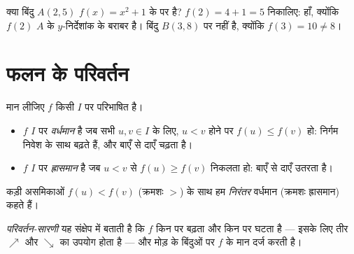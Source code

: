 \begin{example}\label{ex:g10:functions:membership}
क्या बिंदु $A(2, 5)$ $f(x) = x^2 + 1$ के  पर है? $f(2) = 4 + 1 = 5$ निकालिए: हाँ, क्योंकि $f(2)$ $A$
के $y$-निर्देशांक के बराबर है। बिंदु $B(3, 8)$  पर नहीं है, क्योंकि $f(3) = 10 \neq 8$।
\end{example}

\section{फलन के परिवर्तन}

\begin{definition}[वर्धमान, ह्रासमान]\label{def:g10:functions:variations}
मान लीजिए $f$ किसी  $I$ पर परिभाषित है।
\begin{itemize}
  \item $f$ $I$ पर \emph{वर्धमान} है जब सभी $u, v \in I$ के
        लिए, $u < v$ होने पर $f(u) \leq f(v)$ हो: निर्गम निवेश के साथ बढ़ते हैं, और 
        बाएँ से दाएँ चढ़ता है।
  \item $f$ $I$ पर \emph{ह्रासमान} है जब $u < v$ से
        $f(u) \geq f(v)$ निकलता हो:  बाएँ से दाएँ उतरता है।
\end{itemize}
कड़ी असमिकाओं $f(u) < f(v)$ (क्रमशः $>$) के साथ हम \emph{निरंतर} वर्धमान (क्रमशः
ह्रासमान) कहते हैं।
\end{definition}

\begin{definition}[परिवर्तन-सारणी]\label{def:g10:functions:table}
\emph{परिवर्तन-सारणी} यह संक्षेप में बताती है कि $f$
किन  पर बढ़ता और किन पर घटता है --- इसके लिए तीर $\nearrow$ और $\searrow$ का
उपयोग होता है --- और मोड़ के बिंदुओं पर $f$ के मान दर्ज करती है।
\end{definition}

